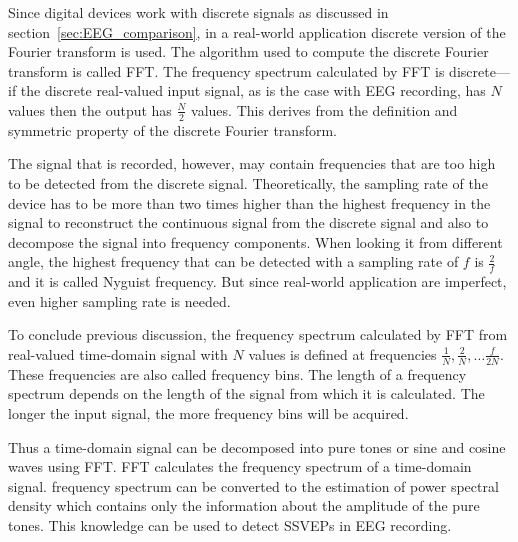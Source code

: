 Since digital devices work with discrete signals as discussed in section~\ref{sec:EEG_comparison}, in a real-world application discrete version of the \gls{Fourier transform} is used. The algorithm used to compute the discrete \gls{Fourier transform} is called \gls{FFT}. The \gls{frequency spectrum} calculated by \gls{FFT} is discrete---if the discrete real-valued input signal, as is the case with \gls{EEG} recording, has $N$ values then the output has $\frac{N}{2}$ values. This derives from the definition and symmetric property of the discrete \gls{Fourier transform}. %

The signal that is recorded, however, may contain frequencies that are too high to be detected from the discrete signal. Theoretically, the \gls{sampling rate} of the device has to be more than two times higher than the highest frequency in the signal to reconstruct the continuous signal from the discrete signal and also to decompose the signal into \glspl{frequency component}. When looking it from different angle, the highest frequency that can be detected with a \gls{sampling rate} of $f$ is $\frac{2}{f}$ and it is called \gls{Nyguist frequency}. But since real-world application are imperfect, even higher \gls{sampling rate} is needed.

To conclude previous discussion, the \gls{frequency spectrum} calculated by \gls{FFT} from real-valued time-domain signal with $N$ values is defined at frequencies $\frac{1}{N}, \frac{2}{N}, \dots\frac{f}{2N}$. These frequencies are also called \glspl{frequency bin}. The length of a \gls{frequency spectrum} depends on the length of the signal from which it is calculated. The longer the input signal, the more \glspl{frequency bin} will be acquired.

Thus a time-domain signal can be decomposed into \glspl{pure tone} or sine and cosine waves using \gls{FFT}. \gls{FFT} calculates the \gls{frequency spectrum} of a time-domain signal. \Gls{frequency spectrum} can be converted to the estimation of \gls{power spectral density} which contains only the information about the amplitude of the \glspl{pure tone}. This knowledge can be used to detect \glspl{SSVEP} in \gls{EEG} recording.


